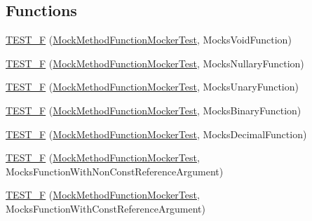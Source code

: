 \subsection*{Functions}
\begin{DoxyCompactItemize}
\item 
\mbox{\hyperlink{namespacetesting_1_1gmock__function__mocker__test_ae7f9fb0bb0ecf0b1ba4b82886b90ab2f}{T\+E\+S\+T\+\_\+F}} (\mbox{\hyperlink{classtesting_1_1gmock__function__mocker__test_1_1_mock_method_function_mocker_test}{Mock\+Method\+Function\+Mocker\+Test}}, Mocks\+Void\+Function)
\item 
\mbox{\hyperlink{namespacetesting_1_1gmock__function__mocker__test_a3514268360556d12bef3a1c82f45281b}{T\+E\+S\+T\+\_\+F}} (\mbox{\hyperlink{classtesting_1_1gmock__function__mocker__test_1_1_mock_method_function_mocker_test}{Mock\+Method\+Function\+Mocker\+Test}}, Mocks\+Nullary\+Function)
\item 
\mbox{\hyperlink{namespacetesting_1_1gmock__function__mocker__test_a35a551fadacfb985595cbd55aaf796d9}{T\+E\+S\+T\+\_\+F}} (\mbox{\hyperlink{classtesting_1_1gmock__function__mocker__test_1_1_mock_method_function_mocker_test}{Mock\+Method\+Function\+Mocker\+Test}}, Mocks\+Unary\+Function)
\item 
\mbox{\hyperlink{namespacetesting_1_1gmock__function__mocker__test_a6f8ae8af75ac1a91607a7d441f5b3a0e}{T\+E\+S\+T\+\_\+F}} (\mbox{\hyperlink{classtesting_1_1gmock__function__mocker__test_1_1_mock_method_function_mocker_test}{Mock\+Method\+Function\+Mocker\+Test}}, Mocks\+Binary\+Function)
\item 
\mbox{\hyperlink{namespacetesting_1_1gmock__function__mocker__test_a7b51041faea5674afd2651cc0eab7a17}{T\+E\+S\+T\+\_\+F}} (\mbox{\hyperlink{classtesting_1_1gmock__function__mocker__test_1_1_mock_method_function_mocker_test}{Mock\+Method\+Function\+Mocker\+Test}}, Mocks\+Decimal\+Function)
\item 
\mbox{\hyperlink{namespacetesting_1_1gmock__function__mocker__test_a0211ece323793b32efe40c05d876e1f8}{T\+E\+S\+T\+\_\+F}} (\mbox{\hyperlink{classtesting_1_1gmock__function__mocker__test_1_1_mock_method_function_mocker_test}{Mock\+Method\+Function\+Mocker\+Test}}, Mocks\+Function\+With\+Non\+Const\+Reference\+Argument)
\item 
\mbox{\hyperlink{namespacetesting_1_1gmock__function__mocker__test_ac0755c3a4372fef8430643ad1ee6dead}{T\+E\+S\+T\+\_\+F}} (\mbox{\hyperlink{classtesting_1_1gmock__function__mocker__test_1_1_mock_method_function_mocker_test}{Mock\+Method\+Function\+Mocker\+Test}}, Mocks\+Function\+With\+Const\+Reference\+Argument)

\end{DoxyCompactItemize}
